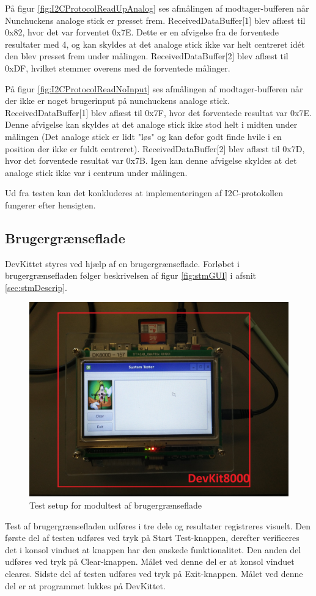 På figur \ref{fig:I2CProtocolReadUpAnalog} ses afmålingen af modtager-bufferen når Nunchuckens analoge stick er presset frem. ReceivedDataBuffer[1] blev aflæst til 0x82, hvor det var forventet 0x7E. Dette er en afvigelse fra de forventede resultater med 4, og kan skyldes at det analoge stick ikke var helt centreret idét den blev presset frem under målingen. ReceivedDataBuffer[2] blev aflæst til 0xDF, hvilket stemmer overens med de forventede målinger.

På figur \ref{fig:I2CProtocolReadNoInput} ses afmålingen af modtager-bufferen når der ikke er noget brugerinput på nunchuckens analoge stick. ReceivedDataBuffer[1] blev aflæst til 0x7F, hvor det forventede resultat var 0x7E. Denne afvigelse kan skyldes at det analoge stick ikke stod helt i midten under målingen (Det analoge stick er lidt "løs" og kan defor godt finde hvile i en position der ikke er fuldt centreret). ReceivedDataBuffer[2] blev aflæst til 0x7D, hvor det forventede resultat var 0x7B. Igen kan denne afvigelse skyldes at det analoge stick ikke var i centrum under målingen.

Ud fra testen kan det konkluderes at implementeringen af I2C-protokollen fungerer efter hensigten.

\subsection{Brugergrænseflade}
DevKittet styres ved hjælp af en brugergrænseflade.
Forløbet i brugergrænsefladen følger beskrivelsen af figur \ref{fig:stmGUI} i afsnit \ref{sec:stmDescrip}.

\begin{figure}[H]
	\centering
	\includegraphics[width=.5\textwidth]{Test/images/GUITest/TestSetup.jpg}
	\caption{Test setup for modultest af brugergrænseflade}
	\label{fig:GUISetup}
\end{figure}

\noindent Test af brugergrænsefladen udføres i tre dele og resultater registreres visuelt. Den første del af testen udføres ved tryk på Start Test-knappen, derefter verificeres det i konsol vinduet at knappen har den ønskede funktionalitet. Den anden del udføres ved tryk på Clear-knappen. Målet ved denne del er at konsol vinduet cleares.
Sidste del af testen udføres ved tryk på Exit-knappen. Målet ved denne del er at programmet lukkes på DevKittet.


